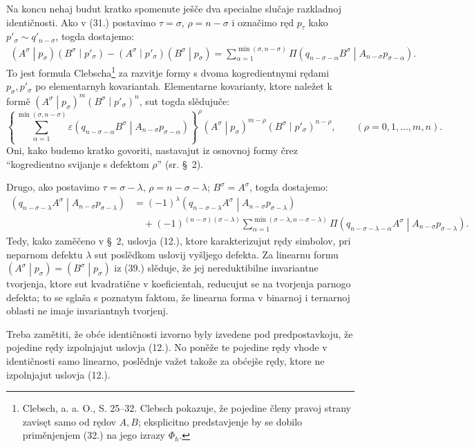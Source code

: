\documentclass[11pt]{article}
\newcommand{\pair}[2]{\left(#1\middle|#2\right)}
\newcommand{\eps}{\varepsilon}
\begin{document}
Na koncu nehaj budut kratko spomenute ješče dva specialne slučaje razkladnoj identičnosti. Ako v (31.) postavimo $\tau=\sigma$, $\rho=n-\sigma$ i označimo ręd $p_\tau$ kako $p'_\sigma\sim q'_{n-\sigma}$, togda dostajemo:
\begin{equation}
\begin{aligned}
\pair{A^\sigma}{p_\sigma}\pair{B^\sigma}{p'_\sigma}
-\pair{A^\sigma}{p'_\sigma}\pair{B^\sigma}{p_\sigma}
=\sum_{\alpha=1}^{\min(\sigma,n-\sigma)}
\Pi\pair{q_{n-\sigma-\alpha}B^\sigma}{A_{n-\sigma}p_{\sigma-\alpha}}.
\end{aligned}
\tag{37}
\end{equation}
To jest formula Clebscha\footnote{Clebsch, a. a. O., S. 25--32. Clebsch pokazuje, že pojedine členy pravoj strany zavisęt samo od rędov $A,B$; eksplicitno predstavjenje by se dobilo priměnjenjem (32.) na jego izrazy $\Phi_h$.} za razvitje formy s dvoma kogredientnymi rędami $p_\sigma,p'_\sigma$ po elementarnyh kovariantah. Elementarne kovarianty, ktore naležet k formě $\pair{A^\sigma}{p_\sigma}^m\pair{B^\sigma}{p'_\sigma}^n$, sut togda slědujuče:
\begin{equation}
 \left\{\sum_{\alpha=1}^{\min(\sigma,n-\sigma)}
 \eps\pair{q_{n-\sigma-\alpha}B^\sigma}{A_{n-\sigma}p_{\sigma-\alpha}}
 \right\}^{\rho}
 \pair{A^\sigma}{p_\sigma}^{m-\rho}\pair{B^\sigma}{p'_\sigma}^{n-\rho},
 \qquad (\rho=0,1,\ldots,m,n).
\tag{38}
\end{equation}
Oni, kako budemo kratko govoriti, nastavajut iz osnovnoj formy črez ``kogredientno svijanje s defektom $\rho$'' (sr. \S\ 2).

Drugo, ako postavimo $\tau=\sigma-\lambda$, $\rho=n-\sigma-\lambda$; $B^\sigma=A^\sigma$, togda dostajemo:
\begin{equation}
\begin{aligned}
\pair{q_{n-\sigma-\lambda}A^\sigma}{A_{n-\sigma}p_{\sigma-\lambda}}
&=(-1)^\lambda
\pair{q_{n-\sigma-\lambda}A^\sigma}{A_{n-\sigma}p_{\sigma-\lambda}}\\
&\quad+(-1)^{(n-\sigma)(\sigma-\lambda)}
 \sum_{\alpha=1}^{\min(\sigma-\lambda,n-\sigma-\lambda)}
 \Pi\pair{q_{n-\sigma-\lambda-\alpha}A^\sigma}
 {A_{n-\sigma}p_{\sigma-\lambda}}.
\end{aligned}
\tag{39}
\end{equation}
Tedy, kako zaměčeno v \S\ 2, uslovja (12.), ktore karakterizujut rędy simbolov, pri neparnom defektu $\lambda$ sut poslědkom uslovij vyšljego defekta. Za linearnu formu $\pair{A^\sigma}{p_\sigma}=\pair{B^\sigma}{p_\sigma}$ iz (39.) slěduje, že jej nereduktibilne invariantne tvorjenja, ktore sut kvadratične v koeficientah, reducujut se na tvorjenja parnogo defekta; to se sglaša s poznatym faktom, že linearna forma v binarnoj i ternarnoj oblasti ne imaje invariantnyh tvorjenj.

Treba zamětiti, že obće identičnosti izvorno byly izvedene pod predpostavkoju, že pojedine rędy izpolnjajut uslovja (12.). No poněže te pojedine rędy vhode v identičnosti samo linearno, poslědnje važet takože za obćejše rędy, ktore ne izpolnjajut uslovja (12.).
\end{document}
